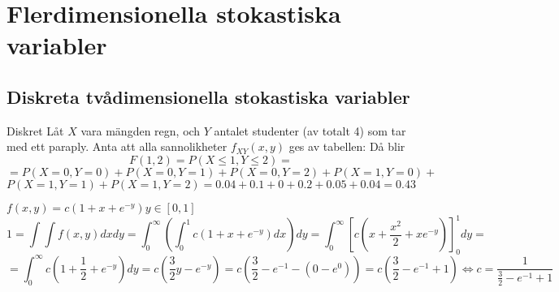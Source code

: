 \chapter{Flerdimensionella stokastiska variabler}
\section{Diskreta tvådimensionella stokastiska variabler}
\begin{exempel}{Diskret}
	Låt $X$ vara mängden regn, och $Y$ antalet studenter (av totalt 4) som tar med ett paraply. Anta att alla sannolikheter $f_{XY}(x,y)$ ges av tabellen:
	Då blir $$
		F(1,2)=P(X\leq1,Y\leq2)=
	$$$$
		=P(X=0,Y=0)+P(X=0,Y=1)+P(X=0,Y=2)+P(X=1,Y=0)+
	$$$$
		P(X=1,Y=1)+P(X=1,Y=2)=0.04+0.1+0+0.2+0.05+0.04=0.43
	$$
\end{exempel}
$f(x,y)=c(1+x+e^{-y})$\indent $y\in[0,1]$
$$
	1=\int\int f(x,y)dxdy=\int_0^\infty(\int_0^1c(1+x+e^{-y})dx)dy=\int_0^\infty[c(x+\frac{x^2}{2}+xe^{-y})]^1_0dy=
$$$$
	=\int_0^\infty c(1+\frac{1}{2}+e^{-y})dy=c(\frac{3}{2}y-e^{-y})=c(\frac{3}{2}-e^{-1}-(0-e^0))=c(\frac{3}{2}-e^{-1}+1)\Leftrightarrow c=\frac{1}{\frac{3}{2}-e^{-1}+1}
$$